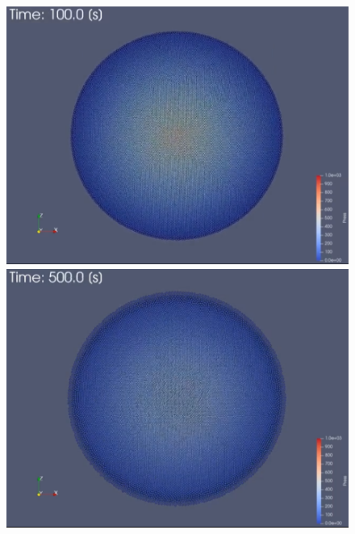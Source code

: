 		\begin{figure} \centering
			\begin{minipage}{.3 \linewidth} \centering
				\includegraphics[clip, width=\linewidth]{img/dsph_snap_100.png}
			\end{minipage}
			\begin{minipage}{.3 \linewidth} \centering
				\includegraphics[clip, width=\linewidth]{img/dsph_snap_500.png}
			\end{minipage}
			\begin{minipage}{.3 \linewidth} \centering

\end{minipage}
\end{figure}
